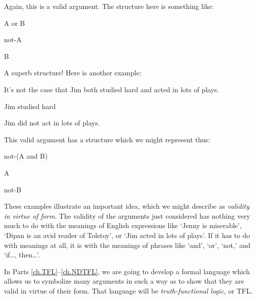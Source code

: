 Again, this is a valid argument. The structure here is something like:
	\begin{earg}
		\item[] A or B
		\item[] not-A
		\item[\therefore] B
	\end{earg}
A superb structure! Here is another example:
	\begin{earg}
		\item[] It's not the case that Jim both studied hard and acted in lots of plays.
		\item[] Jim studied hard
		\item[\therefore] Jim did not act in lots of plays.
	\end{earg}
This valid argument has a structure which we might represent thus:
	\begin{earg}
		\item[] not-(A and B)
		\item[] A
		\item[\therefore] not-B
	\end{earg}
These examples illustrate an important idea, which we might describe as \emph{validity in virtue of form}. The validity of the arguments just considered has nothing very much to do with the meanings of English expressions like `Jenny is miserable', `Dipan is an avid reader of Tolstoy', or `Jim acted in lots of plays'. If it has to do with meanings at all, it is with the meanings of phrases like `and', `or', `not,' and `if\ldots, then\ldots'. 

In Parts \ref{ch.TFL}--\ref{ch.NDTFL}, we are going to develop a formal language which allows us to symbolize many arguments in such a way as to show that they are valid in virtue of their form. That language will be \emph{truth-functional logic}, or TFL.

